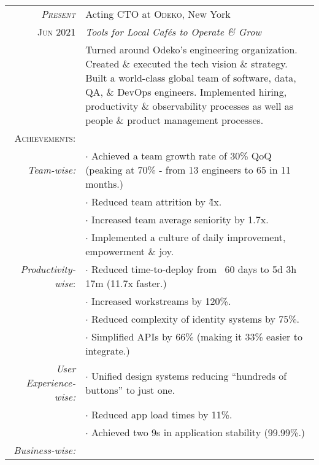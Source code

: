 \documentclass[a4paper,10pt]{article}
\begin{document}
\begin{tabular}{r|p{13cm}}
  \textsc{\emph{Present}} & Acting CTO at \textsc{Odeko}, New York \\

  \textsc{Jun 2021} & \emph{Tools for Local Caf\'{e}s to Operate \& Grow}\\

  &\footnotesize{Turned around Odeko's engineering
    organization. Created \& executed the tech vision \&
    strategy. Built a world-class global team of software, data, QA,
    \& DevOps engineers. Implemented hiring, productivity \&
    observability processes as well as people \& product management
    processes.}\\

  \textsc{Achievements:} \\

  \emph{Team-wise:}

  &$\cdot$ \footnotesize{Achieved a team growth rate of 30\% QoQ (peaking at 70\% - from 13 engineers to 65 in 11 months.)}\\
  &$\cdot$ \footnotesize{Reduced team attrition by \~4x.}\\
  &$\cdot$ \footnotesize{Increased team average seniority by 1.7x.}\\
  &$\cdot$ \footnotesize{Implemented a culture of daily improvement, empowerment \& joy.}\\

  \emph{Productivity-wise}:

  &$\cdot$ \footnotesize{Reduced time-to-deploy from ~60 days to 5d 3h 17m (11.7x faster.)}\\
  &$\cdot$ \footnotesize{Increased workstreams by 120\%.}\\
  &$\cdot$ \footnotesize{Reduced complexity of identity systems by 75\%.}\\
  &$\cdot$ \footnotesize{Simplified APIs by 66\% (making it 33\% easier to integrate.)}\\

  \emph{User Experience-wise:}

  &$\cdot$ \footnotesize{Unified design systems reducing ``hundreds of buttons'' to just one.}\\
  &$\cdot$ \footnotesize{Reduced app load times by 11\%.}\\
  &$\cdot$ \footnotesize{Achieved two 9s in application stability (99.99\%.)}\\

  \emph{Business-wise:}


\end{tabular}
\end{document}
